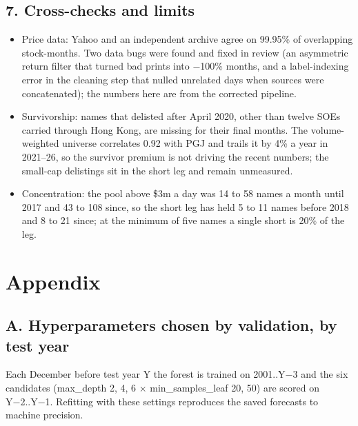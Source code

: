 \documentclass[
  10pt,
  a4paper,
]{article}
\providecommand{\tightlist}{%
  \setlength{\itemsep}{0pt}\setlength{\parskip}{0pt}}
\begin{document}
\subsection{7. Cross-checks and
limits}\label{cross-checks-and-limits}

\begin{itemize}
\tightlist
\item
  Price data: Yahoo and an independent archive agree on
  99.95\% of overlapping stock-months. Two data bugs were
  found and fixed in review (an asymmetric return filter
  that turned bad prints into −100\% months, and a
  label-indexing error in the cleaning step that nulled
  unrelated days when sources were concatenated); the
  numbers here are from the corrected pipeline.
\item
  Survivorship: names that delisted after April 2020, other
  than twelve SOEs carried through Hong Kong, are missing
  for their final months. The volume-weighted universe
  correlates 0.92 with PGJ and trails it by 4\% a year in
  2021--26, so the survivor premium is not driving the
  recent numbers; the small-cap delistings sit in the short
  leg and remain unmeasured.
\item
  Concentration: the pool above \$3m a day was 14 to 58
  names a month until 2017 and 43 to 108 since, so the short
  leg has held 5 to 11 names before 2018 and 8 to 21 since;
  at the minimum of five names a single short is 20\% of the
  leg.
\end{itemize}

\section{Appendix}\label{appendix}

\subsection{A. Hyperparameters chosen by validation, by test
year}\label{a.-hyperparameters-chosen-by-validation-by-test-year}

Each December before test year Y the forest is trained on
2001..Y−3 and the six candidates (max\_depth 2, 4, 6
\(\times\) min\_samples\_leaf 20, 50) are scored on
Y−2..Y−1. Refitting with these settings reproduces the saved
forecasts to machine precision.
\end{document}
